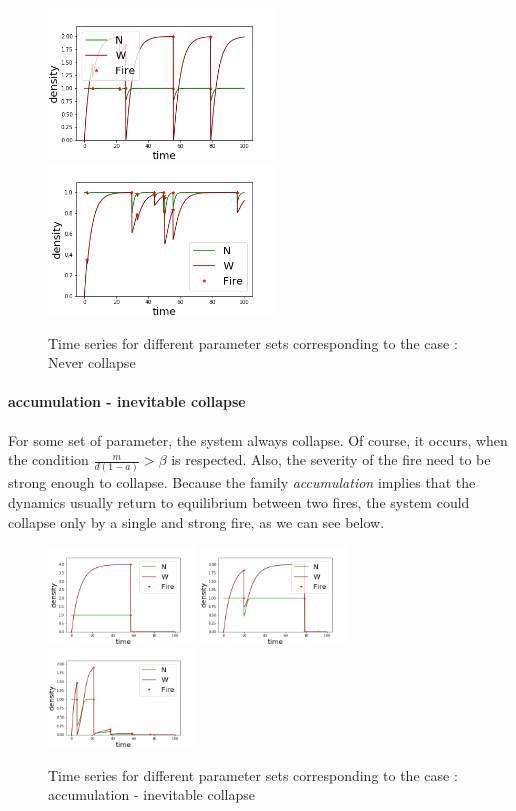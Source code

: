 \documentclass{article}
\begin{document}
\begin{figure}[h!]
\centering
\includegraphics[width=6cm]{return_never_1.png}
\includegraphics[width=6cm]{return_never_2.png}
\caption{Time series for different parameter sets corresponding to the case : Never collapse}
\end{figure}


\paragraph{accumulation - inevitable collapse\\} %
For some set of parameter, the system always collapse. Of course, it occurs, when the condition $\frac{m}{d( 1-a)} > \beta$ is respected. Also, the severity of the fire need to be strong enough to collapse. Because the family \textit{accumulation} implies that the dynamics usually return to equilibrium between two fires, the system could collapse only by a single and strong fire, as we can see below.

\begin{figure}[h!]
\centering
\includegraphics[width=3.9cm]{return_always_1.png}
\includegraphics[width=3.9cm]{return_always_2.png}
\includegraphics[width=3.9cm]{return_always_3.png}
\caption{Time series for different parameter sets corresponding to the case : accumulation - inevitable collapse}
\end{figure}
\end{document}
